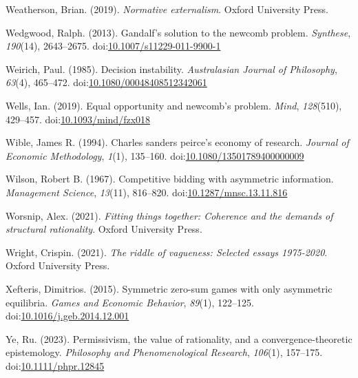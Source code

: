 \documentclass[
  12pt,
  letterpaper,
  DIV=11,
  numbers=noendperiod]{scrreprt}
\newlength{\cslhangindent}
\newenvironment{CSLReferences}[2] %
 {\begin{list}{}{%
  \setlength{\itemindent}{0pt}
  \setlength{\leftmargin}{0pt}
  \setlength{\parsep}{0pt}
  \ifodd #1
   \setlength{\leftmargin}{\cslhangindent}
   \setlength{\itemindent}{-1\cslhangindent}
  \fi
  \setlength{\itemsep}{#2\baselineskip}}}
 {\end{list}}
\begin{document}
\begin{CSLReferences}{1}{0}
Weatherson, Brian. (2019). \emph{Normative externalism}. Oxford
University Press.

Wedgwood, Ralph. (2013). Gandalf's solution to the newcomb problem.
\emph{Synthese}, \emph{190}(14), 2643--2675.
doi:\href{https://doi.org/10.1007/s11229-011-9900-1}{10.1007/s11229-011-9900-1}

Weirich, Paul. (1985). Decision instability. \emph{Australasian Journal
of Philosophy}, \emph{63}(4), 465--472.
doi:\href{https://doi.org/10.1080/00048408512342061}{10.1080/00048408512342061}

Wells, Ian. (2019). Equal opportunity and newcomb's problem.
\emph{Mind}, \emph{128}(510), 429--457.
doi:\href{https://doi.org/10.1093/mind/fzx018}{10.1093/mind/fzx018}

Wible, James R. (1994). Charles sanders peirce's economy of research.
\emph{Journal of Economic Methodology}, \emph{1}(1), 135--160.
doi:\href{https://doi.org/10.1080/13501789400000009}{10.1080/13501789400000009}

Wilson, Robert B. (1967). Competitive bidding with asymmetric
information. \emph{Management Science}, \emph{13}(11), 816--820.
doi:\href{https://doi.org/10.1287/mnsc.13.11.816}{10.1287/mnsc.13.11.816}

Worsnip, Alex. (2021). \emph{Fitting things together: Coherence and the
demands of structural rationality}. Oxford University Press.

Wright, Crispin. (2021). \emph{The riddle of vagueness: Selected essays
1975-2020}. Oxford University Press.

Xefteris, Dimitrios. (2015). Symmetric zero-sum games with only
asymmetric equilibria. \emph{Games and Economic Behavior}, \emph{89}(1),
122--125.
doi:\href{https://doi.org/10.1016/j.geb.2014.12.001}{10.1016/j.geb.2014.12.001}

Ye, Ru. (2023). Permissivism, the value of rationality, and a
convergence-theoretic epistemology. \emph{Philosophy and
Phenomenological Research}, \emph{106}(1), 157--175.
doi:\href{https://doi.org/10.1111/phpr.12845}{10.1111/phpr.12845}

\end{CSLReferences}
\end{document}
